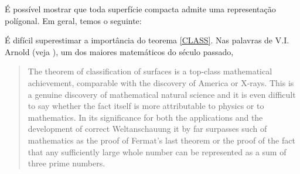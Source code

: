 É possível mostrar que toda superfície compacta admite uma representação polígonal.  Em geral, temos o seguinte:

É difícil superestimar a importância do teorema \cref{CLASS}. Nas palavras de V.I. Arnold (veja ), um dos maiores matemáticos do século passado,
\blockquote{The theorem of classification of surfaces is a top-class mathematical achievement, comparable with the discovery of America or X-rays. This is a genuine discovery of mathematical natural science and it is even difficult to say whether the fact itself is more attributable to physics or to mathematics. In its significance for both the applications and the development of correct Weltanschauung it by far surpasses such  of mathematics as the proof of Fermat's last theorem or the proof of the fact that any sufficiently large whole number can be represented as a sum of three prime numbers.}


